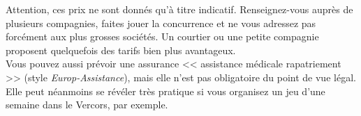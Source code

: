\documentclass[11pt,twoside,a4paper]{article}
\begin{document}
\begin{multicols*}{2}
Attention, ces prix ne sont donn{\'e}s qu'{\`a} titre indicatif. Renseignez-vous aupr{\`e}s de plusieurs compagnies, faites jouer la concurrence et ne vous adressez pas forc{\'e}ment aux plus grosses soci{\'e}t{\'e}s. Un courtier ou une petite compagnie proposent quelquefois des tarifs bien plus avantageux. ~\\

Vous pouvez aussi pr{\'e}voir une assurance << assistance m{\'e}dicale rapatriement >> (style \emph{Europ-Assistance}), mais elle n'est pas obligatoire du point de vue l{\'e}gal. Elle peut n{\'e}anmoins se r{\'e}v{\'e}ler tr{\`e}s pratique si vous organisez un jeu d'une semaine dans le Vercors, par exemple. ~\\

\end{multicols*}
\end{document}
